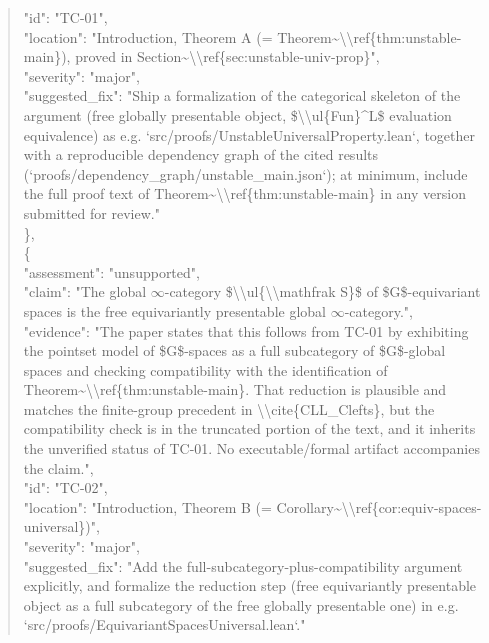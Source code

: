 \documentclass[11pt]{article}
\begin{document}
\begin{quote}
      "id": "TC-01",\\
      "location": "Introduction, Theorem A (= Theorem\~{}\textbackslash{}\textbackslash{}ref\{thm:unstable-main\}), proved in Section\~{}\textbackslash{}\textbackslash{}ref\{sec:unstable-univ-prop\}",\\
      "severity": "major",\\
      "suggested\_fix": "Ship a formalization of the categorical skeleton of the argument (free globally presentable object, \$\textbackslash{}\textbackslash{}ul\{Fun\}\^{}L\$ evaluation equivalence) as e.g. `src/proofs/UnstableUniversalProperty.lean`, together with a reproducible dependency graph of the cited results (`proofs/dependency\_graph/unstable\_main.json`); at minimum, include the full proof text of Theorem\~{}\textbackslash{}\textbackslash{}ref\{thm:unstable-main\} in any version submitted for review."\\
    \},\\
    \{\\
      "assessment": "unsupported",\\
      "claim": "The global \ensuremath{\infty}-category \$\textbackslash{}\textbackslash{}ul\{\textbackslash{}\textbackslash{}mathfrak S\}\$ of \$G\$-equivariant spaces is the free equivariantly presentable global \ensuremath{\infty}-category.",\\
      "evidence": "The paper states that this follows from TC-01 by exhibiting the pointset model of \$G\$-spaces as a full subcategory of \$G\$-global spaces and checking compatibility with the identification of Theorem\~{}\textbackslash{}\textbackslash{}ref\{thm:unstable-main\}. That reduction is plausible and matches the finite-group precedent in \textbackslash{}\textbackslash{}cite\{CLL\_Clefts\}, but the compatibility check is in the truncated portion of the text, and it inherits the unverified status of TC-01. No executable/formal artifact accompanies the claim.",\\
      "id": "TC-02",\\
      "location": "Introduction, Theorem B (= Corollary\~{}\textbackslash{}\textbackslash{}ref\{cor:equiv-spaces-universal\})",\\
      "severity": "major",\\
      "suggested\_fix": "Add the full-subcategory-plus-compatibility argument explicitly, and formalize the reduction step (free equivariantly presentable object as a full subcategory of the free globally presentable one) in e.g. `src/proofs/EquivariantSpacesUniversal.lean`."\\

\end{quote}
\end{document}

